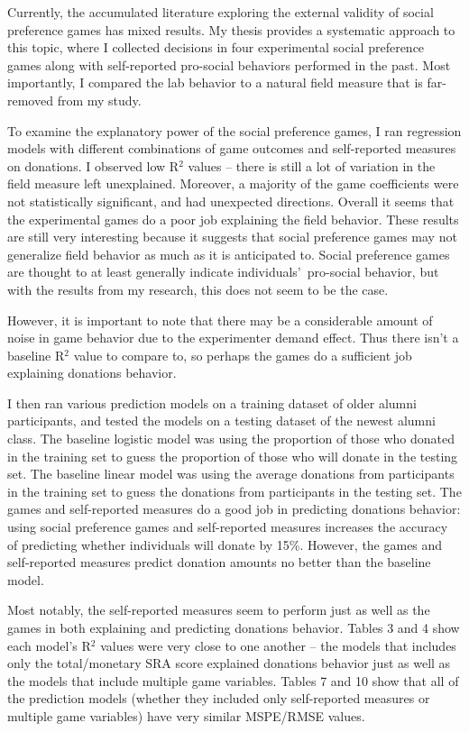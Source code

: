\documentclass[12pt]{article}
\begin{document}
Currently, the accumulated literature exploring the external validity of social preference games has mixed results. My thesis provides a systematic approach to this topic, where I collected decisions in four experimental social preference games along with self-reported pro-social behaviors performed in the past. Most importantly, I compared the lab behavior to a natural field measure that is far-removed from my study.

To examine the explanatory power of the social preference games, I ran regression models with different combinations of game outcomes and self-reported measures on donations. I observed low R$^{2}$ values -- there is still a lot of variation in the field measure left unexplained. Moreover, a majority of the game coefficients were not statistically significant, and had unexpected directions. Overall it seems that the experimental games do a poor job explaining the field behavior. These results are still very interesting because it suggests that social preference games may not generalize field behavior as much as it is anticipated to. Social preference games are thought to at least generally indicate individuals\rq \ pro-social behavior, but with the results from my research, this does not seem to be the case.

However, it is important to note that there may be a considerable amount of noise in game behavior due to the experimenter demand effect. Thus there isn\rq t a baseline R$^{2}$ value to compare to, so perhaps the games do a sufficient job explaining donations behavior.

I then ran various prediction models on a training dataset of older alumni participants, and tested the models on a testing dataset of the newest alumni class. The baseline logistic model was using the proportion of those who donated in the training set to guess the proportion of those who will donate in the testing set. The baseline linear model was using the average donations from participants in the training set to guess the donations from participants in the testing set. The games and self-reported measures do a good job in predicting donations behavior:  using social preference games and self-reported measures increases the accuracy of predicting whether individuals will donate by 15\%. However, the games and self-reported measures predict donation amounts no better than the baseline model.

Most notably, the self-reported measures seem to perform just as well as the games in both explaining and predicting donations behavior. Tables 3 and 4 show each model\rq s R$^{2}$ values were very close to one another -- the models that includes only the total/monetary SRA score explained donations behavior just as well as the models that include multiple game variables. Tables 7 and 10 show that all of the prediction models (whether they included only self-reported measures or multiple game variables) have very similar MSPE/RMSE values.
\end{document}

